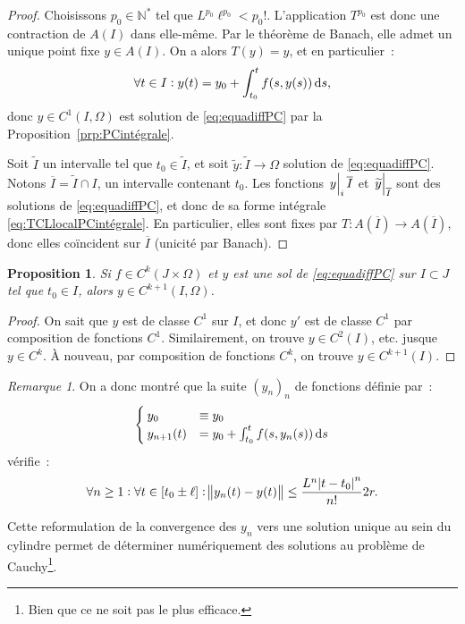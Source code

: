\documentclass{report}
\newtheorem{prp}[thm]{Proposition}
\theoremstyle{definition}
\theoremstyle{remark}
\newtheorem*{rmq}{Remarque}
\numberwithin{equation}{section}
\newcommand{\N}{\mathbb N}
\newcommand{\Ns}{\N^{*}}
\newcommand{\restr}[2]{\left.#1\vphantom{\big|}\right|_{#2}}
\begin{document}
\begin{proof}
			Choisissons $p_0 \in \Ns$ tel que $L^{p_0}\ell^{p_0} < p_0!$. L'application $T^{p_0}$ est donc une contraction de $A(I)$ dans elle-même. Par le
			théorème de Banach, elle admet un unique point fixe $y \in A(I)$. On a alors $T(y) = y$, et en particulier~:
			\begin{align}\label{eq:TCLlocalPCintégrale}
				\forall t \in I : y(t) = y_0 + \int_{t_0}^tf(s, y(s))\dif s,
			\end{align}
			donc $y \in C^1(I, \Omega)$ est solution de \eqref{eq:equadiffPC} par la Proposition~\ref{prp:PCintégrale}.

			Soit $\widetilde I$ un intervalle tel que $t_0 \in \widetilde I$, et soit $\widetilde y : \widetilde I \to \Omega$ solution de \eqref{eq:equadiffPC}.
			Notons $\overline I = \widetilde I \cap I$, un intervalle contenant $t_0$. Les fonctions $\restr yi{\overline I}$ et $\restr {\widetilde y}{\overline I}$
			sont des solutions de \eqref{eq:equadiffPC}, et donc de sa forme intégrale \eqref{eq:TCLlocalPCintégrale}. En particulier, elles sont fixes par
			$T : A(\overline I) \to A(\overline I)$, donc elles coïncident sur $\overline I$ (unicité par Banach).
			\end{proof}		

			\begin{prp} Si $f \in C^k(J \times \Omega)$ et $y$ est une sol de \eqref{eq:equadiffPC} sur $I \subset J$ tel que $t_0 \in I$, alors $y \in C^{k+1}(I, \Omega)$.
			\end{prp}

			\begin{proof} On sait que $y$ est de classe $C^1$ sur $I$, et donc $y'$ est de classe $C^1$ par composition de fonctions $C^1$. Similairement, on
			trouve $y \in C^2(I)$, etc. jusque $y \in C^k$. À nouveau, par composition de fonctions $C^k$, on trouve $y \in C^{k+1}(I)$.
			\end{proof}

			\begin{rmq} On a donc montré que la suite $(y_n)_n$ de fonctions définie par~:
			\begin{equation}
				\begin{cases}
				y_0 &\equiv y_0 \\
				y_{n+1}(t) &= y_0 + \int_{t_0}^tf(s, y_n(s))\dif s
			\end{cases}
			\end{equation}
			vérifie~:
			\begin{equation}
				\forall n \geq 1 : \forall t \in [t_0 \pm \ell] : \norm {y_n(t) - y(t)} \leq \frac {L^n\abs {t-t_0}^n}{n!}2r.
			\end{equation}

			Cette reformulation de la convergence des $y_n$  vers une solution unique au sein du cylindre permet de déterminer numériquement des solutions au
			problème de Cauchy\footnote{Bien que ce ne soit pas le plus efficace.}.
			\end{rmq}
\end{document}
